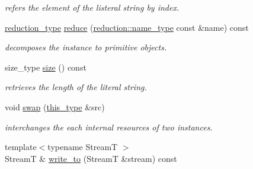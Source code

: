 \begin{DoxyCompactItemize}
\begin{DoxyCompactList}\small\item\em refers the element of the listeral string by index. \end{DoxyCompactList}\item 
\hypertarget{classhryky_1_1_literal_string_ac4a806fc6b694fe212f4aac9b26561ed}{\hyperlink{namespacehryky_a343a9a4c36a586be5c2693156200eadc}{reduction\-\_\-type} \hyperlink{classhryky_1_1_literal_string_ac4a806fc6b694fe212f4aac9b26561ed}{reduce} (\hyperlink{namespacehryky_1_1reduction_ac686c30a4c8d196bbd0f05629a6b921f}{reduction\-::name\-\_\-type} const \&name) const }\label{classhryky_1_1_literal_string_ac4a806fc6b694fe212f4aac9b26561ed}

\begin{DoxyCompactList}\small\item\em decomposes the instance to primitive objects. \end{DoxyCompactList}\item 
\hypertarget{classhryky_1_1_literal_string_af2221b58fef20ed4d474891681995c97}{size\-\_\-type \hyperlink{classhryky_1_1_literal_string_af2221b58fef20ed4d474891681995c97}{size} () const }\label{classhryky_1_1_literal_string_af2221b58fef20ed4d474891681995c97}

\begin{DoxyCompactList}\small\item\em retrieves the length of the literal string. \end{DoxyCompactList}\item 
\hypertarget{classhryky_1_1_literal_string_a482315d45c49dc688b017c2793c92730}{void \hyperlink{classhryky_1_1_literal_string_a482315d45c49dc688b017c2793c92730}{swap} (\hyperlink{classhryky_1_1_literal_string}{this\-\_\-type} \&src)}\label{classhryky_1_1_literal_string_a482315d45c49dc688b017c2793c92730}

\begin{DoxyCompactList}\small\item\em interchanges the each internal resources of two instances. \end{DoxyCompactList}\item 
\hypertarget{classhryky_1_1_literal_string_ab6cbb2ab10459a946ef3d186d1014178}{{\footnotesize template$<$typename Stream\-T $>$ }\\Stream\-T \& \hyperlink{classhryky_1_1_literal_string_ab6cbb2ab10459a946ef3d186d1014178}{write\-\_\-to} (Stream\-T \&stream) const }\label{classhryky_1_1_literal_string_ab6cbb2ab10459a946ef3d186d1014178}


\end{DoxyCompactItemize}
